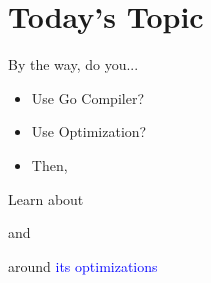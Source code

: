 \section{Today's Topic}
\begin{frame}
  \frametitlesec

  By the way, do you...

  \large
  \begin{itemize}[<+->]
    \pause
    \item[\emoji{woman-raising-hand}] Use Go Compiler?

    \item[\large \emoji{woman-raising-hand}] {\large Use Optimization?}

    \item[] Then,

  \end{itemize}
\end{frame}

\begin{frame}
  \frametitlesec
  \Large
  \semibf

  \centering

  Learn about\pause

  \vspace*{15pt}
  {\color{red}}\pause
  \vspace*{6pt}

  and
  \vspace*{10pt}

  around \textcolor{blue}{its optimizations}

\end{frame}
